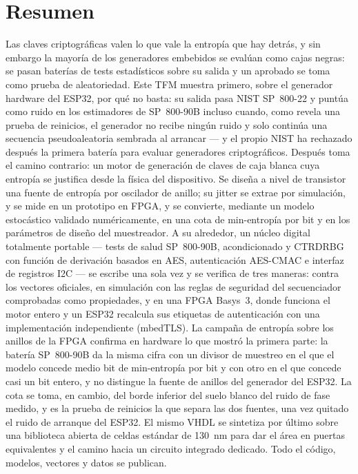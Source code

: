 \documentclass[12pt, a4paper, oneside]{report}
\begin{document}
\chapter*{Resumen}

Las claves criptogr\'aficas valen lo que vale la entrop\'ia que hay
detr\'as, y sin embargo la mayor\'ia de los generadores embebidos se
eval\'uan como cajas negras: se pasan bater\'ias de tests estad\'isticos
sobre su salida y un aprobado se toma como prueba de aleatoriedad. Este
TFM muestra primero, sobre el generador hardware del ESP32, por qu\'e no
basta: su salida pasa NIST SP~800-22 y punt\'ua como ruido en los
estimadores de SP~800-90B incluso cuando, como revela una prueba de
reinicios, el generador no recibe ning\'un ruido y solo contin\'ua una
secuencia pseudoaleatoria sembrada al arrancar --- y el propio NIST ha
rechazado despu\'es la primera bater\'ia para evaluar generadores
criptogr\'aficos. Despu\'es toma el camino contrario: un motor de
generaci\'on de claves de caja blanca cuya
entrop\'ia se justifica desde la f\'isica del dispositivo. Se dise\~na a
nivel de transistor una fuente de entrop\'ia por oscilador de anillo; su
jitter se extrae por simulaci\'on, y se mide en un prototipo en FPGA, y
se convierte, mediante un modelo estoc\'astico validado num\'ericamente,
en una cota de min-entrop\'ia por bit y en los par\'ametros de dise\~no del
muestreador. A su alrededor, un n\'ucleo digital totalmente portable ---
tests de salud SP~800-90B, acondicionado y \acs{CTRDRBG} con funci\'on de
derivaci\'on basados en AES, autenticaci\'on AES-CMAC e interfaz de
registros \acs{I2C} --- se escribe una sola vez y se verifica de tres
maneras: contra los vectores oficiales, en simulaci\'on con las reglas de
seguridad del secuenciador comprobadas como propiedades, y en una FPGA
Basys~3, donde funciona el motor entero y un ESP32 recalcula sus
etiquetas de autenticaci\'on con una implementaci\'on independiente
(mbedTLS). La campa\~na de entrop\'ia sobre los anillos de la FPGA
confirma en hardware lo que mostr\'o la primera parte: la bater\'ia
SP~800-90B da la misma cifra con un divisor de muestreo en el que el
modelo concede medio bit de min-entrop\'ia por bit y con otro en el que
concede casi un bit entero, y no distingue la fuente de anillos del
generador del ESP32. La cota se toma, en cambio, del borde inferior del
suelo blanco del ruido de fase medido, y es la prueba de reinicios la que
separa las dos fuentes, una vez quitado el ruido de arranque del ESP32.
El mismo VHDL se sintetiza
por \'ultimo sobre una biblioteca abierta de celdas est\'andar de 130~nm
para dar el \'area en puertas equivalentes y el camino hacia un circuito
integrado dedicado. Todo el c\'odigo, modelos, vectores y datos se
publican.
\end{document}
